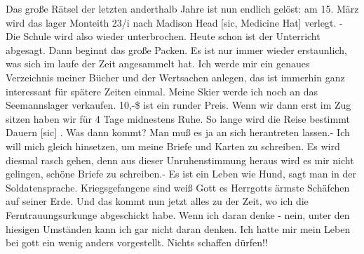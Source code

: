 \def\day{8. M\"{a}rz 1944.}
\mktitle

Das gro{\ss}e R\"{a}tsel der letzten anderthalb Jahre ist nun endlich gel\"{o}st: am 15. M\"{a}rz wird das lager Monteith 23/i nach Madison Head {\color{red} [sic, Medicine Hat] } verlegt.
- Die Schule wird also wieder unterbrochen.
Heute schon ist der Unterricht abgesagt.
Dann beginnt das gro{\ss}e Packen.
Es ist nur immer wieder erstaunlich, was sich im laufe der Zeit angesammelt hat.
Ich werde mir ein genaues Verzeichnis meiner B\"{u}cher und der Wertsachen anlegen, das ist immerhin ganz interessant f\"{u}r sp\"{a}tere Zeiten einmal.
Meine Skier werde ich noch an das Seemannslager verkaufen.
10,-{\$} ist ein runder Preis.
Wenn wir dann erst im Zug sitzen haben wir f\"{u}r 4 Tage midnestens Ruhe.
So lange wird die Reise bestimmt Dauern{\color{red} [sic] }.
Was dann kommt?
Man mu{\ss} es ja an sich herantreten lassen.-
Ich will mich gleich hinsetzen, um meine Briefe und Karten zu schreiben.
Es wird diesmal rasch gehen, denn aus dieser Unruhenstimmung heraus wird es mir nicht gelingen, sch\"{o}ne Briefe zu schreiben.-
Es ist ein Leben wie Hund, sagt man in der Soldatensprache.
Kriegsgefangene sind wei{\ss} Gott es Herrgotts \"{a}rmste Sch\"{a}fchen auf seiner Erde.
Und das kommt nun jetzt alles zu der Zeit, wo ich die Ferntrauungsurkunge abgeschickt habe.
Wenn ich daran denke - nein, unter den hiesigen Umst\"{a}nden kann ich gar nicht daran denken.
Ich hatte mir mein Leben bei gott ein wenig anders vorgestellt.
Nichts schaffen d\"{u}rfen!!

\clearpage
